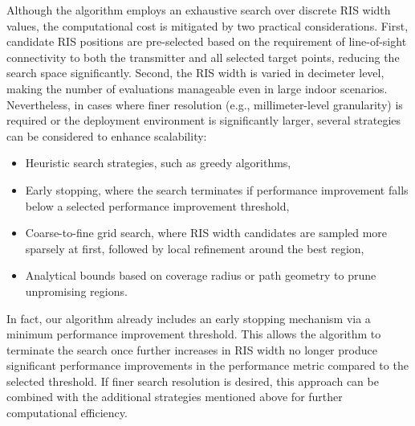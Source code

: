 \documentclass{IEEEoj}
\begin{document}
Although the algorithm employs an exhaustive search over discrete RIS width values, the computational cost is mitigated by two practical considerations. First, candidate RIS positions are pre-selected based on the requirement of line-of-sight connectivity to both the transmitter and all selected target points, reducing the search space significantly. Second, the RIS width is varied in decimeter level, making the number of evaluations manageable even in large indoor scenarios. Nevertheless, in cases where finer resolution (e.g., millimeter-level granularity) is required or the deployment environment is significantly larger, several strategies can be considered to enhance scalability:
\begin{itemize}
	\item Heuristic search strategies, such as greedy algorithms,
	\item Early stopping, where the search terminates if performance improvement falls below a selected performance improvement threshold,
	\item Coarse-to-fine grid search, where RIS width candidates are sampled more sparsely at first, followed by local refinement around the best region,
	\item Analytical bounds based on coverage radius or path geometry to prune unpromising regions.
\end{itemize}
In fact, our algorithm already includes an early stopping mechanism via a minimum performance improvement threshold. This allows the algorithm to terminate the search once further increases in RIS width no longer produce significant performance improvements in the performance metric compared to the selected threshold. If finer search resolution is desired, this approach can be combined with the additional strategies mentioned above for further computational efficiency.
\end{document}
